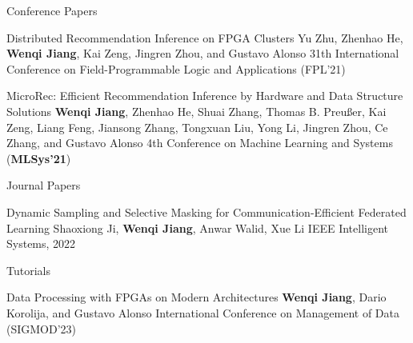 \begin{rSection}{Conference Papers}
\begin{enumerate}[label={[\arabic*]}]
\item 
\begin{Pub}{Distributed Recommendation Inference on FPGA Clusters}
{Yu Zhu, Zhenhao He, \textbf{Wenqi Jiang}, Kai Zeng, Jingren Zhou, and Gustavo Alonso}
{31th International Conference on Field-Programmable Logic and Applications (FPL'21)}
\end{Pub}

\item 
\begin{Pub}{MicroRec: Efficient Recommendation Inference by Hardware and Data Structure Solutions}
{\textbf{Wenqi Jiang}, Zhenhao He, Shuai Zhang, Thomas B. Preußer, Kai Zeng, Liang Feng, Jiansong Zhang, Tongxuan Liu, Yong Li, Jingren Zhou, Ce Zhang, and Gustavo Alonso}
{4th Conference on Machine Learning and Systems (\textbf{MLSys'21})}
\end{Pub}\end{enumerate}
\end{rSection}



\begin{rSection}{Journal Papers}
\begin{enumerate}[label={[\arabic*]}]

\item 
\begin{Pub}{Dynamic Sampling and Selective Masking for Communication-Efficient Federated Learning}
{Shaoxiong Ji, \textbf{Wenqi Jiang}, Anwar Walid, Xue Li}
{IEEE Intelligent Systems, 2022 }
\end{Pub}\end{enumerate}
\end{rSection}



\begin{rSection}{Tutorials}

\begin{enumerate}[label={[\arabic*]}]

\item 
\begin{Pub}{Data Processing with FPGAs on Modern Architectures}
{\textbf{Wenqi Jiang}, Dario Korolija, and Gustavo Alonso}
{International Conference on Management of Data (SIGMOD'23)}
\end{Pub}\end{enumerate}
\end{rSection}

